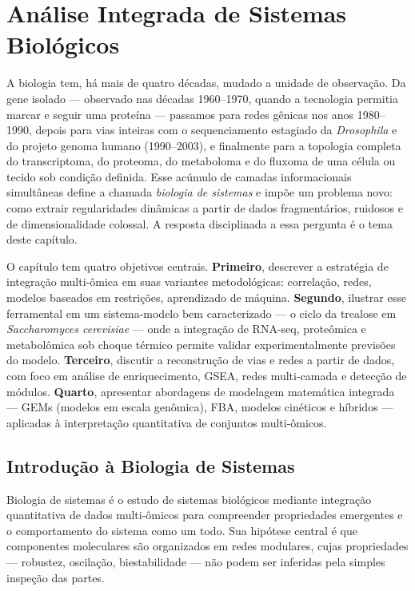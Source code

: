 
\chapter{Análise Integrada de Sistemas Biológicos}
\label{cap:11}

\normalfont\rmfamily\upshape
A biologia tem, há mais de quatro décadas, mudado a unidade de observação. Da
gene isolado --- observado nas décadas 1960--1970, quando a tecnologia
permitia marcar e seguir uma proteína --- passamos para redes gênicas nos anos
1980--1990, depois para vias inteiras com o sequenciamento estagiado da
\textit{Drosophila} e do projeto genoma humano (1990--2003), e finalmente
para a topologia completa do transcriptoma, do proteoma, do metaboloma e do
fluxoma de uma célula ou tecido sob condição definida. Esse acúmulo de
camadas informacionais simultâneas define a chamada \emph{biologia de sistemas}
e impõe um problema novo: como extrair regularidades dinâmicas a partir de
dados fragmentários, ruidosos e de dimensionalidade colossal. A resposta
disciplinada a essa pergunta é o tema deste capítulo.

O capítulo tem quatro objetivos centrais. \textbf{Primeiro}, descrever a
estratégia de integração multi-ômica em suas variantes metodológicas: correlação,
redes, modelos baseados em restrições, aprendizado de máquina. \textbf{Segundo},
ilustrar esse ferramental em um sistema-modelo bem caracterizado --- o ciclo da
trealose em \textit{Saccharomyces cerevisiae} --- onde a integração de RNA-seq,
proteômica e metabolômica sob choque térmico permite validar experimentalmente
previsões do modelo. \textbf{Terceiro}, discutir a reconstrução de vias e
redes a partir de dados, com foco em análise de enriquecimento, GSEA, redes
multi-camada e detecção de módulos. \textbf{Quarto}, apresentar abordagens de
modelagem matemática integrada --- GEMs (modelos em escala genômica), FBA,
modelos cinéticos e híbridos --- aplicadas à interpretação quantitativa de
conjuntos multi-ômicos.

\section{Introdução à Biologia de Sistemas}
\label{sec:11-introducao}

\begin{definicaoenv}
Biologia de sistemas é o estudo de sistemas biológicos mediante integração
quantitativa de dados multi-ômicos para compreender propriedades emergentes
e o comportamento do sistema como um todo. Sua hipótese central é que
componentes moleculares são organizados em redes modulares, cujas
propriedades --- robustez, oscilação, biestabilidade --- não podem ser
inferidas pela simples inspeção das partes.
\end{definicaoenv}

